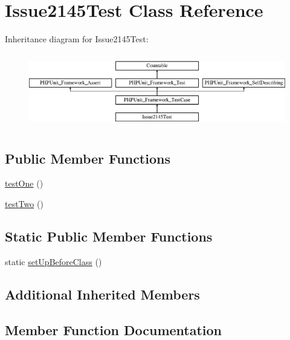 \hypertarget{class_issue2145_test}{}\section{Issue2145\+Test Class Reference}
\label{class_issue2145_test}
Inheritance diagram for Issue2145\+Test\+:\begin{figure}[H]
\begin{center}
\leavevmode
\includegraphics[height=3.303835cm]{class_issue2145_test}
\end{center}
\end{figure}
\subsection*{Public Member Functions}
\begin{DoxyCompactItemize}
\item 
\mbox{\hyperlink{class_issue2145_test_afbf3ff88b322c6a7197ce02297cd23a0}{test\+One}} ()
\item 
\mbox{\hyperlink{class_issue2145_test_a4fb9974ce113d5d1db8075e0db0dc9b6}{test\+Two}} ()
\end{DoxyCompactItemize}
\subsection*{Static Public Member Functions}
\begin{DoxyCompactItemize}
\item 
static \mbox{\hyperlink{class_issue2145_test_a80ef9eb20e7443b38276fb4647985fb7}{set\+Up\+Before\+Class}} ()
\end{DoxyCompactItemize}
\subsection*{Additional Inherited Members}


\subsection{Member Function Documentation}
\mbox{\label{class_issue2145_test_a80ef9eb20e7443b38276fb4647985fb7}} 
